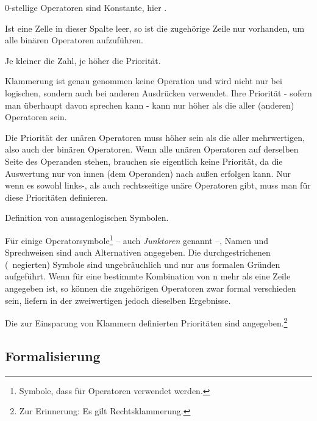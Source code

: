 \begin{table}
\begin{threeparttable}
\begin{tablenotes}
			\item[2] 0-stellige Operatoren sind Konstante, hier \emph{}.
			\item[3] Ist eine Zelle in dieser Spalte leer, so ist die zugehörige Zeile nur vorhanden, um alle binären Operatoren aufzuführen.
			\item[4] Je kleiner die Zahl, je höher die Priorität.
			\item[5] Klammerung ist genau genommen keine Operation und wird nicht nur bei logischen, sondern auch bei anderen Ausdrücken verwendet. Ihre Priorität - sofern man überhaupt davon sprechen kann - kann nur höher als die aller (anderen) Operatoren sein.
			\item[6] Die Priorität der unären Operatoren muss höher sein als die aller mehrwertigen, also auch der binären Operatoren.
			Wenn alle unären Operatoren auf derselben Seite des Operanden stehen, brauchen sie eigentlich keine Priorität, da die Auswertung nur von innen (dem Operanden) nach außen erfolgen kann.
			Nur wenn es sowohl links-, als auch rechtsseitige unäre Operatoren gibt, muss man für diese Prioritäten definieren.
		\end{tablenotes}
	\end{threeparttable}
	\caption{Definition von aussagenlogischen Symbolen.}
	\label{tab:Symbole}%
\end{table}

Für einige Operatorsymbole\footnote{%
	Symbole, dass für Operatoren verwendet werden.%
}
-- auch \emph{Junktoren} genannt --,
Namen und Sprechweisen sind auch Alternativen angegeben.
Die durchgestrichenen (\textdh\ negierten) Symbole sind ungebräuchlich und nur aus formalen Gründen aufgeführt.
Wenn für eine bestimmte Kombination von n mehr als eine Zeile angegeben ist, so können die zugehörigen Operatoren zwar formal verschieden sein, liefern in der zweiwertigen  jedoch dieselben Ergebnisse.

Die zur Einsparung von Klammern definierten Prioritäten sind  angegeben.\footnote{Zur Erinnerung: Es gilt Rechtsklammerung. }

\subsection{Formalisierung}%
\label{sub:Formalisierung}

